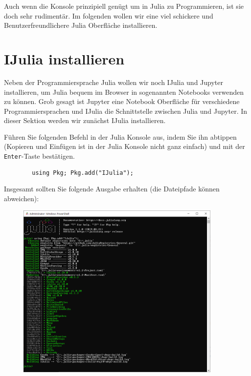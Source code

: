 \documentclass[11pt, a4paper]{scrartcl}
\begin{document}
	Auch wenn die Konsole prinzipiell genügt um in Julia zu Programmieren, ist sie doch sehr rudimentär. Im folgenden wollen wir eine viel schickere und Benutzerfreundlichere Julia Oberfläche installieren.
	
	\newpage
	\section{IJulia installieren}
	
	Neben der Programmiersprache Julia wollen wir noch IJulia und Jupyter installieren, um Julia bequem im Browser in sogenannten Notebooks verwenden zu können. Grob gesagt ist Jupyter eine Notebook Oberfläche für verschiedene Programmiersprachen und IJulia die Schnittstelle zwischen Julia und Jupyter. In dieser Sektion werden wir zunächst IJulia installieren.

	Führen Sie folgenden Befehl in der Julia Konsole aus, indem Sie ihn abtippen (Kopieren und Einfügen ist in der Julia Konsole nicht ganz einfach) und mit der \texttt{Enter}-Taste bestätigen.
	
	\begin{lstlisting}
		using Pkg; Pkg.add("IJulia");
	\end{lstlisting}

	Insgesamt sollten Sie folgende Ausgabe erhalten (die Dateipfade können abweichen):
	
	\begin{figure}[h!]
	\centering
	\includegraphics[width=0.9\textwidth]{imgs/IJulia_install.png}
	\end{figure}
\end{document}
